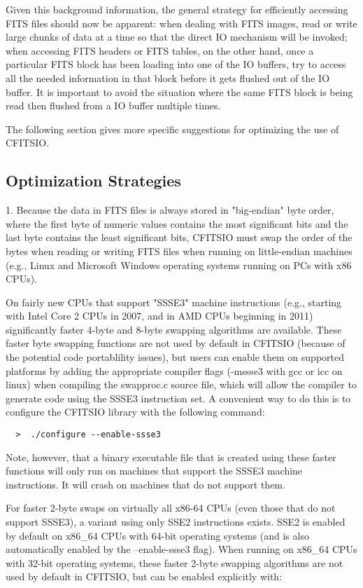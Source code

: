 \documentclass[11pt]{book}
\begin{document}
Given this background information, the general strategy for efficiently
accessing FITS files should now be apparent:  when dealing with FITS
images, read or write large chunks of data at a time so that the direct
IO mechanism will be invoked;  when accessing FITS headers or FITS
tables, on the other hand, once a particular FITS block has been
loading into one of the IO buffers, try to access all the needed
information in that block before it gets flushed out of the IO buffer.
It is important to avoid the situation where the same FITS block is
being read then flushed from a IO buffer multiple times.

The following section gives more specific suggestions for optimizing
the use of CFITSIO.


\subsection{Optimization Strategies}

1.  Because the data in FITS files is always stored in "big-endian" byte order,
where the first byte of numeric values contains the most significant bits and the
last byte contains the least significant bits, CFITSIO must swap the order of the bytes
when reading or writing FITS files when running on little-endian machines (e.g.,
Linux and Microsoft Windows operating systems running on PCs with x86 CPUs).

On fairly new CPUs that support "SSSE3" machine instructions
(e.g., starting with Intel Core 2 CPUs in 2007, and in AMD CPUs
beginning in 2011) significantly faster 4-byte and 8-byte swapping
algorithms are available. These faster byte swapping functions are
not used by default in CFITSIO (because of the potential code
portablility issues), but users can enable them on supported
platforms by adding the appropriate compiler flags (-mssse3 with gcc
or icc on linux) when compiling the swapproc.c source file, which will
allow the compiler to generate code using the SSSE3 instruction set.
A convenient way to do this is to configure the CFITSIO library
with the following command:

\begin{verbatim}
  >  ./configure --enable-ssse3
\end{verbatim}
Note, however, that a binary executable file that is
created using these faster functions will only run on
machines that support the SSSE3 machine instructions. It will
crash on machines that do not support them.

For faster 2-byte swaps on virtually all x86-64 CPUs (even those that
do not support SSSE3), a variant using only SSE2 instructions exists.
SSE2 is enabled by default on x86\_64 CPUs with 64-bit operating systems
(and is also automatically enabled by the --enable-ssse3 flag).
When running on x86\_64 CPUs with 32-bit operating systems, these faster
2-byte swapping algorithms are not used by default in CFITSIO, but can be
enabled explicitly with:
\end{document}
